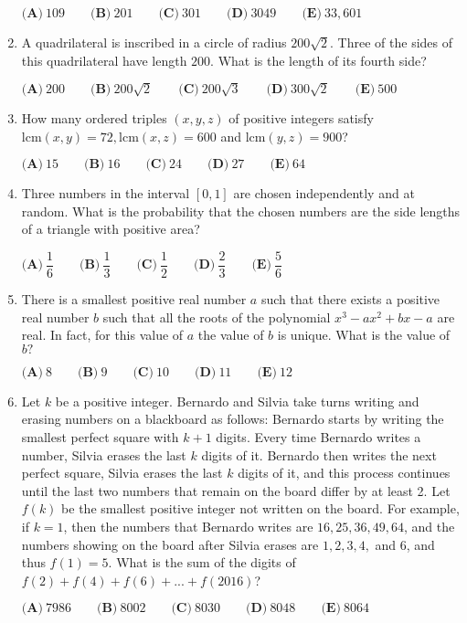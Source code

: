 \documentclass{article}
\begin{document}
\begin{enumerate}[label=\arabic*., itemsep=0.5em]
$\textbf{(A)}\ 109\qquad\textbf{(B)}\ 201\qquad\textbf{(C)}\ 301\qquad\textbf{(D)}\ 3049\qquad\textbf{(E)}\ 33,601$\par \vspace{0.5em}\item A quadrilateral is inscribed in a circle of radius $200\sqrt{2}.$ Three of the sides of this quadrilateral have length $200.$ What is the length of its fourth side? 

$\textbf{(A)}\ 200\qquad\textbf{(B)}\ 200\sqrt{2} \qquad\textbf{(C)}\ 200\sqrt{3} \qquad\textbf{(D)}\ 300\sqrt{2} \qquad\textbf{(E)}\ 500$\par \vspace{0.5em}\item How many ordered triples $(x,y,z)$ of positive integers satisfy $\text{lcm}(x,y) = 72, \text{lcm}(x,z) = 600$ and $\text{lcm}(y,z)=900$?

$\textbf{(A)}\ 15\qquad\textbf{(B)}\ 16\qquad\textbf{(C)}\ 24\qquad\textbf{(D)}\ 27\qquad\textbf{(E)}\ 64$\par \vspace{0.5em}\item Three numbers in the interval $\left[0,1\right]$ are chosen independently and at random. What is the probability that the chosen numbers are the side lengths of a triangle with positive area?

$\textbf{(A)}\ \dfrac{1}{6}\qquad\textbf{(B)}\ \dfrac{1}{3}\qquad\textbf{(C)}\ \dfrac{1}{2}\qquad\textbf{(D)}\ \dfrac{2}{3}\qquad\textbf{(E)}\ \dfrac{5}{6}$\par \vspace{0.5em}\item There is a smallest positive real number $a$ such that there exists a positive real number $b$ such that all the roots of the polynomial $x^3-ax^2+bx-a$ are real. In fact, for this value of $a$ the value of $b$ is unique. What is the value of $b?$

$\textbf{(A)}\ 8\qquad\textbf{(B)}\ 9\qquad\textbf{(C)}\ 10\qquad\textbf{(D)}\ 11\qquad\textbf{(E)}\ 12$\par \vspace{0.5em}\item Let $k$ be a positive integer. Bernardo and Silvia take turns writing and erasing numbers on a blackboard as follows: Bernardo starts by writing the smallest perfect square with $k+1$ digits. Every time Bernardo writes a number, Silvia erases the last $k$ digits of it. Bernardo then writes the next perfect square, Silvia erases the last $k$ digits of it, and this process continues until the last two numbers that remain on the board differ by at least 2. Let $f(k)$ be the smallest positive integer not written on the board. For example, if $k = 1$, then the numbers that Bernardo writes are $16, 25, 36, 49, 64$, and the numbers showing on the board after Silvia erases are $1, 2, 3, 4,$ and $6$, and thus $f(1) = 5$. What is the sum of the digits of $f(2) + f(4)+ f(6) + ... + f(2016)$?

$\textbf{(A)}\ 7986\qquad\textbf{(B)}\ 8002\qquad\textbf{(C)}\ 8030\qquad\textbf{(D)}\ 8048\qquad\textbf{(E)}\ 8064$\par \vspace{0.5em}\end{enumerate}
\end{document}
